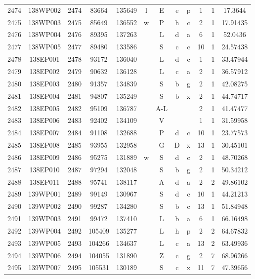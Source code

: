 \begin{tabular}{|*{12}{c|}}
2474 & 138WP002 & 2474 & 83664 & 135649 & l & E & e & p & 1 & 1 & 17.3644 \\ 
2475 & 138WP003 & 2475 & 85649 & 136552 & w & P & h & c & 2 & 1 & 17.91435 \\ 
2476 & 138WP004 & 2476 & 89395 & 137263 &  & L & d & a & 6 & 1 & 52.0436 \\ 
2477 & 138WP005 & 2477 & 89480 & 133586 &  & S & c & c & 10 & 1 & 24.57438 \\ 
2478 & 138EP001 & 2478 & 93172 & 136040 &  & L & d & c & 1 & 1 & 33.47944 \\ 
2479 & 138EP002 & 2479 & 90632 & 136128 &  & L & c & a & 2 & 1 & 36.57912 \\ 
2480 & 138EP003 & 2480 & 91357 & 134839 &  & S & b & g & 2 & 1 & 42.08275 \\ 
2481 & 138EP004 & 2481 & 94807 & 135249 &  & S & b & x & 2 & 1 & 44.74717 \\ 
2482 & 138EP005 & 2482 & 95109 & 136787 &  & A-L &  &  & 2 & 1 & 41.47477 \\ 
2483 & 138EP006 & 2483 & 92402 & 134109 &  & V &  &  & 1 & 1 & 31.59958 \\ 
2484 & 138EP007 & 2484 & 91108 & 132688 &  & P & d & c & 10 & 1 & 23.77573 \\ 
2485 & 138EP008 & 2485 & 93955 & 132958 &  & G & D & x & 13 & 1 & 30.45101 \\ 
2486 & 138EP009 & 2486 & 95275 & 131889 & w & S & d & c & 2 & 1 & 48.70268 \\ 
2487 & 138EP010 & 2487 & 97294 & 132048 &  & S & b & g & 2 & 1 & 50.34212 \\ 
2488 & 138EP011 & 2488 & 95741 & 138117 &  & A & d & a & 2 & 2 & 49.86102 \\ 
2489 & 139WP001 & 2489 & 99149 & 130967 &  & S & d & c & 10 & 1 & 44.21213 \\ 
2490 & 139WP002 & 2490 & 99287 & 134280 &  & S & b & c & 13 & 1 & 51.84948 \\ 
2491 & 139WP003 & 2491 & 99472 & 137410 &  & L & b & a & 6 & 1 & 66.16498 \\ 
2492 & 139WP004 & 2492 & 105409 & 135277 &  & L & h & p & 2 & 2 & 64.67832 \\ 
2493 & 139WP005 & 2493 & 104266 & 134637 &  & L & c & a & 13 & 2 & 63.49936 \\ 
2494 & 139WP006 & 2494 & 104055 & 131890 &  & Z & c & g & 2 & 7 & 68.96266 \\ 
2495 & 139WP007 & 2495 & 105531 & 130189 &  & S & c & x & 11 & 7 & 47.39656 \\ 

\end{tabular}
